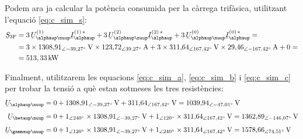 \begin{exemple}
Podem ara ja calcular la pot\`{e}ncia consumida per la c\`{a}rrega
trif\`{a}sica, utilitzant l'equaci\'{o} \eqref{eq:c_sim_s}:
\[
\begin{split}
\cmplx{S}\ped{3F} &=  3\, \cmplx{U}_{\alphaup\nuup}^{(1)}
\cmplx{I}_\alphaup^{(1)\,*} + 3\, \cmplx{U}_{\alphaup\nuup}^{(2)}
\cmplx{I}_\alphaup^{(2)\,*} +  3\,
\cmplx{U}_{\alphaup\nuup}^{(0)}  \cmplx{I}_\alphaup^{(0)\,*} = \\
&= 3 \times 1308{,}91_{\angle -39{,}27\degree}\unit{V} \times
123{,}72_{\angle 39{,}27\degree}\unit{A} + 3 \times
311{,}64_{\angle
167{,}42\degree}\unit{V} \times 29{,}46_{\angle -167{,}42\degree}\unit{A} + 0 = \\
&= 513{,33}\unit{kW}
\end{split}
\]

Finalment, utilitzarem les equacions \eqref{eq:c_sim_a},
\eqref{eq:c_sim_b} i \eqref{eq:c_sim_c} per trobar la tensi\'{o} a qu\`{e}
estan sotmeses les tres resist\`{e}ncies:
\begin{align*}
    \cmplx{U}_{\alphaup\nuup} &= 0 + 1308{,}91_{\angle -39{,}27\degree}\unit{V} +
    311{,}64_{\angle 167{,}42\degree}\unit{V}  =
    1039{,}94_{\angle -47{,}01\degree}\unit{V} \\[1ex]
    \cmplx{U}_{\betaup\nuup} &= 0 + 1_{\angle 240\degree} \times
    1308{,}91_{\angle -39{,}27\degree}\unit{V} +
    1_{\angle 120\degree} \times
    311{,}64_{\angle 167{,}42\degree}\unit{V}  =
    1362{,}89_{\angle -146{,}07\degree}\unit{V}    \\[1ex]
    \cmplx{U}_{\gammaup\nuup} &= 0 + 1_{\angle 120\degree} \times
    1308{,}91_{\angle -39{,}27\degree}\unit{V} +
    1_{\angle 240\degree} \times 311{,}64_{\angle 167{,}42\degree}\unit{V}  =
    1578{,}66_{\angle 74{,}51\degree}\unit{V}
\end{align*}
\end{exemple}

